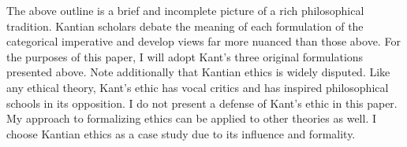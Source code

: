 \begin{isabellebody}
\begin{isamarkuptext}
The above outline is a brief and incomplete picture of a rich philosophical tradition. Kantian scholars
debate the meaning of each formulation of the categorical imperative and develop views far more 
nuanced than those above. For the purposes of this paper, I will adopt Kant's three original 
formulations presented above. Note additionally that Kantian ethics is widely disputed. Like any 
ethical theory, Kant's ethic has vocal critics and has inspired philosophical schools in its 
opposition. I do not present a defense of Kant's ethic in this paper. My approach to formalizing 
ethics can be applied to other theories as well. I choose Kantian ethics as a case study due to its 
influence and formality.%
\end{isamarkuptext}\isamarkuptrue%
%
\isadelimdocument
%
\endisadelimdocument
%
\isatagdocument
%
\isamarkuptrue%
%
\isamarkuptrue%
%
\isamarkuptrue%
%
\isamarkuptrue%
%
\isamarkuptrue%
%
\isamarkuptrue%
%
\isamarkuptrue%
%
\endisatagdocument
{\isafolddocument}%
%
\isadelimdocument
%
\endisadelimdocument
%
\isadelimtheory
%
\endisadelimtheory
%
\isatagtheory
%
\endisatagtheory
{\isafoldtheory}%
%
\isadelimtheory
%
\endisadelimtheory
%
\end{isabellebody}%
\endinput

